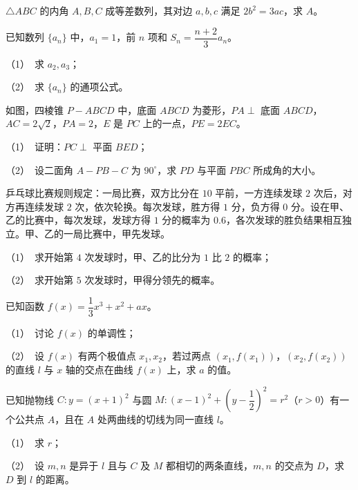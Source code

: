 \begin{question}
$\triangle ABC$ 的内角 $A,B,C$ 成等差数列，其对边 $a,b,c$ 满足 $2b^2=3ac$，求 $A$。

\end{question}
\begin{question}
已知数列 $\{a_n\}$ 中，$a_1=1$，前 $n$ 项和 $S_n=\dfrac{n+2}{3}a_n$。

（1）　求 $a_2,a_3$；

（2）　求 $\{a_n\}$ 的通项公式。

\Needspace{0.4\textheight}
\end{question}
\begin{question}
如图，四棱锥 $P-ABCD$ 中，底面 $ABCD$ 为菱形，$PA\perp$ 底面 $ABCD$，$AC=2\sqrt2$，$PA=2$，$E$ 是 $PC$ 上的一点，$PE=2EC$。
\nopagebreak[4]
\begin{center}\end{center}
\nopagebreak[4]
（1）　证明：$PC\perp$ 平面 $BED$；

（2）　设二面角 $A-PB-C$ 为 $90^\circ$，求 $PD$ 与平面 $PBC$ 所成角的大小。

\end{question}
\begin{question}
乒乓球比赛规则规定：一局比赛，双方比分在 $10$ 平前，一方连续发球 $2$ 次后，对方再连续发球 $2$ 次，依次轮换。每次发球，胜方得 $1$ 分，负方得 $0$ 分。设在甲、乙的比赛中，每次发球，发球方得 $1$ 分的概率为 $0.6$，各次发球的胜负结果相互独立。甲、乙的一局比赛中，甲先发球。

（1）　求开始第 $4$ 次发球时，甲、乙的比分为 $1$ 比 $2$ 的概率；

（2）　求开始第 $5$ 次发球时，甲得分领先的概率。

\end{question}
\begin{question}
已知函数 $f(x)=\dfrac13x^3+x^2+ax$。

（1）　讨论 $f(x)$ 的单调性；

（2）　设 $f(x)$ 有两个极值点 $x_1,x_2$，若过两点 $(x_1,f(x_1))$，$(x_2,f(x_2))$ 的直线 $l$ 与 $x$ 轴的交点在曲线 $f(x)$ 上，求 $a$ 的值。

\end{question}
\begin{question}
已知抛物线 $C:y=(x+1)^2$ 与圆 $M:(x-1)^2+\left(y-\dfrac12\right)^2=r^2$（$r>0$）有一个公共点 $A$，且在 $A$ 处两曲线的切线为同一直线 $l$。

（1）　求 $r$；

（2）　设 $m,n$ 是异于 $l$ 且与 $C$ 及 $M$ 都相切的两条直线，$m,n$ 的交点为 $D$，求 $D$ 到 $l$ 的距离。

\end{question}